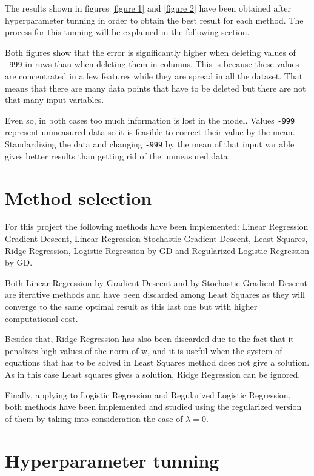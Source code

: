 \documentclass[10pt,conference]{IEEEtran}
\begin{document}
The results shown in figures \ref{figure 1} and \ref{figure 2} have been obtained after hyperparameter tunning in order to obtain the best result for each method. The process for this tunning will be explained in the following section. 

Both figures show that the error is significantly higher when deleting values of \verb|-999| in rows than when deleting them in columns. This is because these values are concentrated in a few features while they are spread in all the dataset. That means that there are many data points that have to be deleted but there are not that many input variables. 

Even so, in both cases too much information is lost in the model. Values \verb|-999| represent unmeasured data so it is feasible to correct their value by the mean. Standardizing the data and changing \verb|-999| by the mean of that input variable gives better results than getting rid of the unmeasured data.

\section{Method selection}

For this project the following methods have been implemented: Linear Regression Gradient Descent, Linear Regression Stochastic Gradient Descent, Least Squares, Ridge Regression, Logistic Regression by GD and Regularized Logistic Regression by GD.


Both Linear Regression by Gradient Descent and by Stochastic Gradient Descent are iterative methods and have been discarded among Least Squares as they will converge to the same optimal result as this last one but with higher computational cost. 

Besides that, Ridge Regression has also been discarded due to the fact that it penalizes high values of the norm of w, and it is useful when the system of equations that has to be solved in Least Squares method does not give a solution. As in this case Least squares gives a solution, Ridge Regression can be ignored. 


Finally, applying to Logistic Regression and Regularized Logistic Regression, both methods have been implemented and studied using the regularized version of them by taking into consideration the case of $\lambda=0$. 

\section{Hyperparameter tunning}
\end{document}
